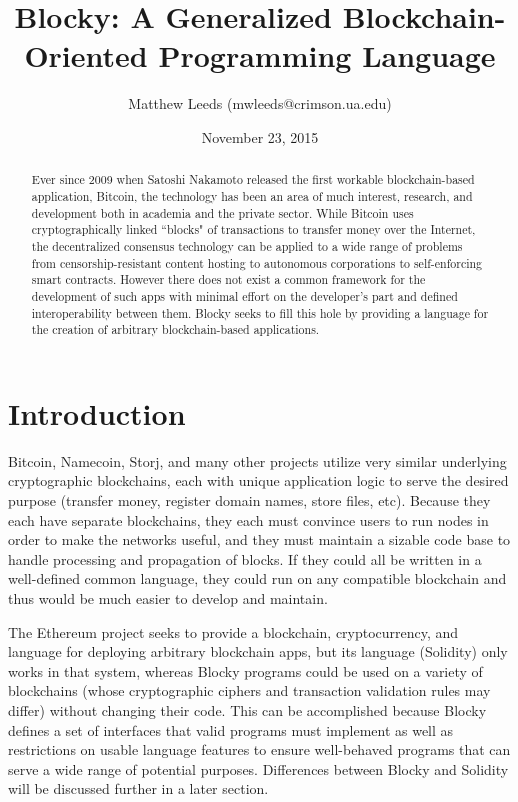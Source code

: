 \documentclass[letterpaper]{article}
\title{Blocky: A Generalized Blockchain-Oriented Programming Language}
\author{Matthew Leeds (mwleeds@crimson.ua.edu)}
\date{November 23, 2015}
\begin{document}
\maketitle

\begin{abstract}
Ever since 2009 when Satoshi Nakamoto released the first workable blockchain-based application, Bitcoin, the technology has been an area of much interest, research, and development both in academia and the private sector. While Bitcoin uses cryptographically linked ``blocks" of transactions to transfer money over the Internet, the decentralized consensus technology can be applied to a wide range of problems from censorship-resistant content hosting to autonomous corporations to self-enforcing smart contracts. However there does not exist a common framework for the development of such apps with minimal effort on the developer's part and defined interoperability between them. Blocky seeks to fill this hole by providing a language for the creation of arbitrary blockchain-based applications.
\end{abstract}

\section{Introduction}

Bitcoin, Namecoin, Storj, and many other projects utilize very similar underlying cryptographic blockchains, each with unique application logic to serve the desired purpose (transfer money, register domain names, store files, etc). Because they each have separate blockchains, they each must convince users to run nodes in order to make the networks useful, and they must maintain a sizable code base to handle processing and propagation of blocks. If they could all be written in a well-defined common language, they could run on any compatible blockchain and thus would be much easier to develop and maintain.

The Ethereum project seeks to provide a blockchain, cryptocurrency, and language for deploying arbitrary blockchain apps, but its language (Solidity) only works in that system, whereas Blocky programs could be used on a variety of blockchains (whose cryptographic ciphers and transaction validation rules may differ) without changing their code. This can be accomplished because Blocky defines a set of interfaces that valid programs must implement as well as restrictions on usable language features to ensure well-behaved programs that can serve a wide range of potential purposes. Differences between Blocky and Solidity will be discussed further in a later section.
\end{document}
